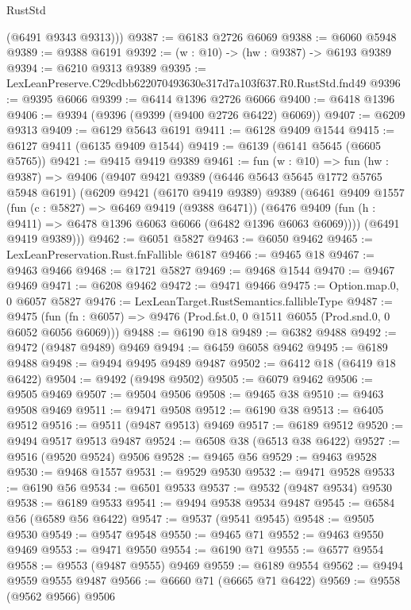 \begin{lexlean}{RustStd}
\begin{coremodule}
        (@6491 @9343 @9313)))
@9387 := @6183 @2726 @6069
@9388 := @6060 @5948
@9389 := @9388 @6191
@9392 := (w : @10) -> (hw : @9387) -> @6193 @9389
@9394 := @6210 @9313 @9389
@9395 := LexLeanPreserve.C29cdbb622070493630e317d7a103f637.R0.RustStd.fnd49
@9396 := @9395 @6066
@9399 := @6414 @1396 @2726 @6066
@9400 := @6418 @1396
@9406 := @9394 (@9396 (@9399 (@9400 @2726 @6422) @6069))
@9407 := @6209 @9313
@9409 := @6129 @5643 @6191
@9411 := @6128 @9409 @1544
@9415 := @6127 @9411 (@6135 @9409 @1544)
@9419 := @6139 (@6141 @5645 (@6605 @5765))
@9421 := @9415 @9419 @9389
@9461 := fun (w : @10) =>
  fun (hw : @9387) =>
  @9406
    (@9407
      @9421
      @9389
      (@6446 @5643 @5645 @1772 @5765 @5948 @6191)
      (@6209
        @9421
        (@6170 @9419 @9389)
        @9389
        (@6461
          @9409
          @1557
          (fun (c : @5827) => @6469 @9419 (@9388 @6471))
          (@6476 @9409 (fun (h : @9411) => @6478 @1396 @6063 @6066 (@6482 @1396 @6063 @6069))))
        (@6491 @9419 @9389)))
@9462 := @6051 @5827
@9463 := @6050 @9462
@9465 := LexLeanPreservation.Rust.fnFallible @6187
@9466 := @9465 @18
@9467 := @9463 @9466
@9468 := @1721 @5827
@9469 := @9468 @1544
@9470 := @9467 @9469
@9471 := @6208 @9462
@9472 := @9471 @9466
@9475 := Option.map.{0, 0} @6057 @5827
@9476 := LexLeanTarget.RustSemantics.fallibleType
@9487 := @9475
    (fun (fn : @6057) => @9476 (Prod.fst.{0, 0} @1511 @6055 (Prod.snd.{0, 0} @6052 @6056 @6069)))
@9488 := @6190 @18
@9489 := @6382 @9488
@9492 := @9472 (@9487 @9489) @9469
@9494 := @6459 @6058 @9462
@9495 := @6189 @9488
@9498 := @9494 @9495 @9489 @9487
@9502 := @6412 @18 (@6419 @18 @6422)
@9504 := @9492 (@9498 @9502)
@9505 := @6079 @9462
@9506 := @9505 @9469
@9507 := @9504 @9506
@9508 := @9465 @38
@9510 := @9463 @9508 @9469
@9511 := @9471 @9508
@9512 := @6190 @38
@9513 := @6405 @9512
@9516 := @9511 (@9487 @9513) @9469
@9517 := @6189 @9512
@9520 := @9494 @9517 @9513 @9487
@9524 := @6508 @38 (@6513 @38 @6422)
@9527 := @9516 (@9520 @9524) @9506
@9528 := @9465 @56
@9529 := @9463 @9528
@9530 := @9468 @1557
@9531 := @9529 @9530
@9532 := @9471 @9528
@9533 := @6190 @56
@9534 := @6501 @9533
@9537 := @9532 (@9487 @9534) @9530
@9538 := @6189 @9533
@9541 := @9494 @9538 @9534 @9487
@9545 := @6584 @56 (@6589 @56 @6422)
@9547 := @9537 (@9541 @9545)
@9548 := @9505 @9530
@9549 := @9547 @9548
@9550 := @9465 @71
@9552 := @9463 @9550 @9469
@9553 := @9471 @9550
@9554 := @6190 @71
@9555 := @6577 @9554
@9558 := @9553 (@9487 @9555) @9469
@9559 := @6189 @9554
@9562 := @9494 @9559 @9555 @9487
@9566 := @6660 @71 (@6665 @71 @6422)
@9569 := @9558 (@9562 @9566) @9506

\end{coremodule}
\end{lexlean}
